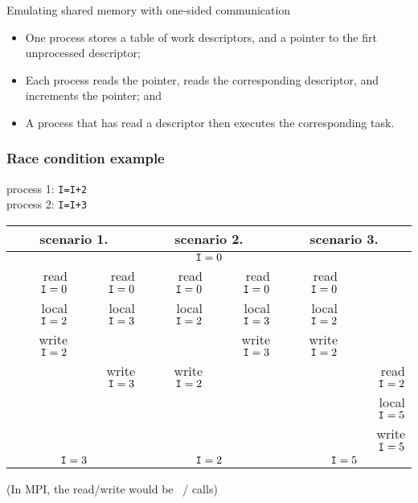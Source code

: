 
\begin{frame}{Emulating shared memory with one-sided communication}
  \begin{itemize}
  \item One process stores a table of work descriptors, and a pointer to
    the firt unprocessed descriptor;
  \item Each process reads the pointer, reads the corresponding
    descriptor, and increments the pointer; and
  \item A process that has read a descriptor then executes the
    corresponding task.
  \end{itemize}
\end{frame}

\begin{frame}[containsverbatim]\frametitle{Race condition example}
  \scriptsize
  \begin{tabbing}
    process 1: \texttt{I=I+2}\\
    process 2: \texttt{I=I+3}
  \end{tabbing}
  \begin{tabular}{|rr|rr|rr|}
    \hline
    \multicolumn{2}{|c|}{scenario 1.}& \multicolumn{2}{|c|}{scenario 2.}&
    \multicolumn{2}{|c|}{scenario 3.}\\ \hline
    \multicolumn{6}{|c|}{$\n{I}=0$}\\ \hline
    read $\n{I}=0$&read $\n{I}=0$&
    read $\n{I}=0$&read $\n{I}=0$&
    read $\n{I}=0$& \\
    local $\n{I}=2$&local $\n{I}=3$& 
    local $\n{I}=2$&local $\n{I}=3$&
    local $\n{I}=2$& \\
    write $\n{I}=2$& & &write $\n{I}=3$&write $\n{I}=2$& \\
    &write $\n{I}=3$&write $\n{I}=2$& & &read $\n{I}=2$\\
    &&&&&local $\n{I}=5$\\
    &&&&&write $\n{I}=5$\\
    \hline
    \multicolumn{2}{|c|}{$\n{I}=3$}& \multicolumn{2}{|c|}{$\n{I}=2$}&
    \multicolumn{2}{|c|}{$\n{I}=5$}\\ \hline
  \end{tabular}

  (In MPI, the read/write would be ~/  calls)
\end{frame}

